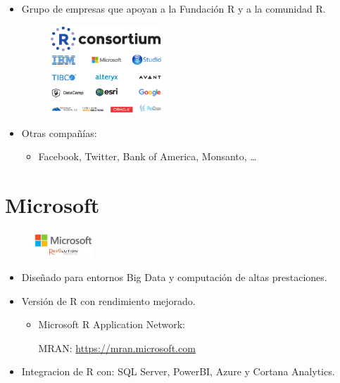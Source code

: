 \documentclass[]{book}
\providecommand{\tightlist}{%
  \setlength{\itemsep}{0pt}\setlength{\parskip}{0pt}}
\begin{document}
\begin{itemize}
\item
  Grupo de empresas que apoyan a la Fundación R y a la comunidad R.

  \begin{figure}
  \centering
  \includegraphics[width=0.40000\textwidth]{figuras/rconsortium2.png}
  \caption{}
  \end{figure}
\item
  Otras compañías:

  \begin{itemize}
  \tightlist
  \item
    Facebook, Twitter, Bank of America, Monsanto, \ldots{}
  \end{itemize}
\end{itemize}

\section{Microsoft}\label{microsoft}

\begin{figure}
\centering
\includegraphics[width=0.20000\textwidth]{figuras/Revolution.jpeg}
\caption{}
\end{figure}

\begin{itemize}
\item
  Diseñado para entornos Big Data y computación de altas prestaciones.
\item
  Versión de R con rendimiento mejorado.

  \begin{itemize}
  \item
    Microsoft R Application Network:

    MRAN: \url{https://mran.microsoft.com}
  \end{itemize}
\item
  Integracion de R con: SQL Server, PowerBI, Azure y Cortana Analytics.
\end{itemize}
\end{document}
